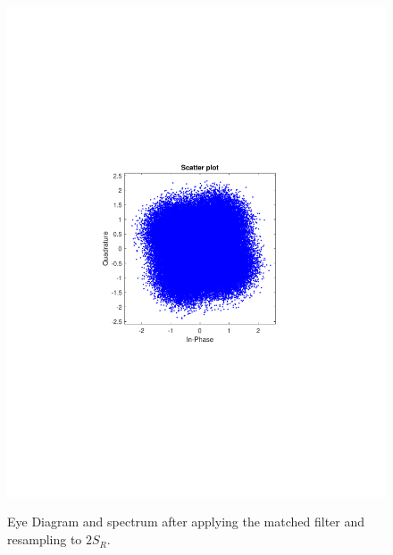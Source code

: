 \begin{refsection}
\begin{figure}[H]
\begin{minipage}{0.30\textwidth}
		\includegraphics[clip, trim=4cm 8cm 4cm 8cm, width=1\textwidth]{./sdf/m_qam_system/figures/expResults/homodyne/2_const_4GBdInSig13dBc_AfMF.pdf}
		\label{fig:4GBdSpecBefFec}
	\end{minipage}
	\caption{Eye Diagram and spectrum after applying the matched filter and resampling to $2 S_R$.}
	\label{fig:4GBMFHm}
\end{figure}


\end{refsection}
